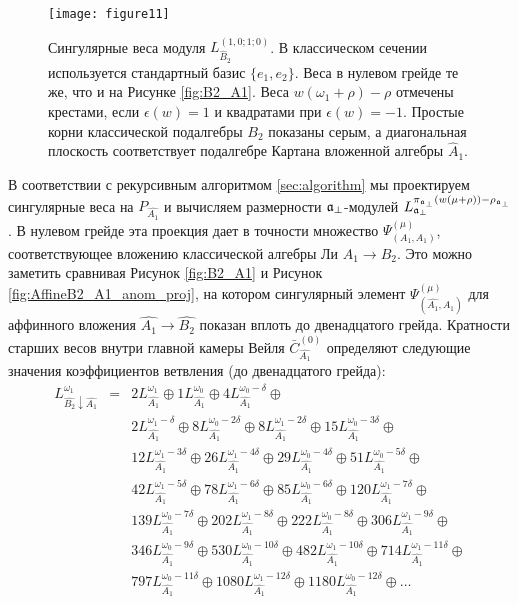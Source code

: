 \begin{figure}[h!tb]
  \texttt{[image: figure11]}
  \caption{Сингулярные веса модуля $L^{(1,0;1;0)}_{\hat B_2 }$. В классическом сечении используется стандартный базис  $\{e_1,e_2\}$. Веса в нулевом грейде те же, что и на Рисунке \ref{fig:B2_A1}. Веса  $w (\omega_1+\rho)-\rho$ отмечены крестами, если $\epsilon(w)=1$ и квадратами при $\epsilon(w)=-1$. Простые корни классической подалгебры  $B_2$ показаны серым, а диагональная плоскость соответствует подалгебре Картана вложенной алгебры $\hat{A}_1$.}
  \label{fig:affine_B2_anom_point}
\end{figure}

В соответствии с рекурсивным алгоритмом  \ref{sec:algorithm} мы проектируем сингулярные веса на $P_{\hat{A_1}}$ и вычисляем размерности $\mathfrak{a}_{\perp}$-модулей $L^{\pi_{\mathfrak{a}_{\perp}}(w(\mu+\rho))-\rho_{\mathfrak{a}_{\perp}}}_{\mathfrak{a}_{\perp}}$. В нулевом грейде эта проекция дает в точности множество $\Psi ^{\left( \mu \right) }_{\left(  A_1, A_1 \right)}$, соответствующее вложению классической алгебры Ли  $A_1\rightarrow B_2$. Это можно заметить сравнивая Рисунок \ref{fig:B2_A1} и Рисунок \ref{fig:AffineB2_A1_anom_proj}, на котором сингулярный элемент $\Psi ^{\left( \mu \right) }_{\left(  \widehat{A_1}, A_1 \right)}$ для аффинного вложения  $\hat{A_1}\to\hat{B_{2}}$  показан вплоть до двенадцатого грейда. Кратности старших весов внутри главной камеры Вейля
$\bar{C}^{\left( 0 \right)}_{\hat{A_1}}$ определяют следующие значения коэффициентов ветвления (до двенадцатого грейда):
\begin{eqnarray*}
  \label{eq:28}
  L^{\omega_1}_{\hat{B_2}\downarrow \hat{A_1}}
  &=&2 L_{\hat{A_1}}^{\omega_1}\oplus 1 L_{\hat{A_1}}^{\omega_0}\oplus 4 L_{\hat{A_1}}^{\omega_0-\delta}\oplus\\
    &&2 L_{\hat{A_1}}^{\omega_1-\delta}\oplus 8 L_{\hat{A_1}}^{\omega_0-2\delta}\oplus
    8 L_{\hat{A_1}}^{\omega_1-2\delta}\oplus 15 L_{\hat{A_1}}^{\omega_0-3\delta}\oplus\\
    &&12 L_{\hat{A_1}}^{\omega_1-3\delta}\oplus 26 L_{\hat{A_1}}^{\omega_1-4\delta}\oplus
    29 L_{\hat{A_1}}^{\omega_0-4\delta}\oplus 51 L_{\hat{A_1}}^{\omega_0-5\delta}\oplus\\
    &&42 L_{\hat{A_1}}^{\omega_1-5\delta}\oplus 78 L_{\hat{A_1}}^{\omega_1-6\delta}\oplus
    85 L_{\hat{A_1}}^{\omega_0-6\delta}\oplus 120 L_{\hat{A_1}}^{\omega_1-7\delta}\oplus\\
    &&139 L_{\hat{A_1}}^{\omega_0-7\delta}\oplus 202 L_{\hat{A_1}}^{\omega_1-8\delta}\oplus
    222 L_{\hat{A_1}}^{\omega_0-8\delta}\oplus 306 L_{\hat{A_1}}^{\omega_1-9\delta}\oplus\\
    &&346 L_{\hat{A_1}}^{\omega_0-9\delta}\oplus 530 L_{\hat{A_1}}^{\omega_0-10\delta}\oplus
    482 L_{\hat{A_1}}^{\omega_1-10\delta}\oplus 714 L_{\hat{A_1}}^{\omega_1-11\delta}\oplus\\
    &&797 L_{\hat{A_1}}^{\omega_0-11\delta}\oplus 1080 L_{\hat{A_1}}^{\omega_1-12\delta}\oplus
    1180 L_{\hat{A_1}}^{\omega_0-12\delta}\oplus \dots
\end{eqnarray*}
